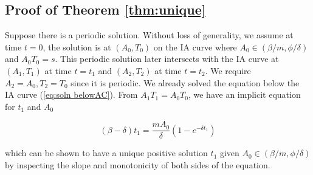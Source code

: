 \documentclass[review,authoryear]{elsarticle}
\begin{document}
\subsection*{Proof of Theorem \ref{thm:unique}}
Suppose there is a periodic solution. Without loss of generality,
we assume at time $t=0$, the solution is at $(A_{0},T_{0})$ on the
IA curve where $A_{0}\in(\beta/m,\phi/\delta)$ and $A_{0}T_{0}=s$.
This periodic solution later intersects with the IA curve at $(A_{1},T_{1})$
at time $t=t_{1}$ and $(A_{2},T_{2})$ at time $t=t_{2}$. We require
$A_{2}=A_{0},T_{2}=T_{0}$ since it is periodic. We already solved
the equation below the IA curve (\ref{eq:soln belowAC}). From $A_{1}T_{1}=A_{0}T_{0}$, we
have an implicit equation for $t_{1}$ and $A_{0}$
\begin{linenomath*}
\begin{equation}
(\beta-\delta)t_{1}=\frac{mA_{0}}{\delta}(1-e^{-\delta t_{1}})\label{eq:A1T1=00003DA0T0}
\end{equation}
\end{linenomath*}
which can be shown to have a unique positive solution $t_{1}$ given $A_{0}\in(\beta/m,\phi/\delta)$ by inspecting the slope and monotonicity of both sides of the equation. 
\end{document}

